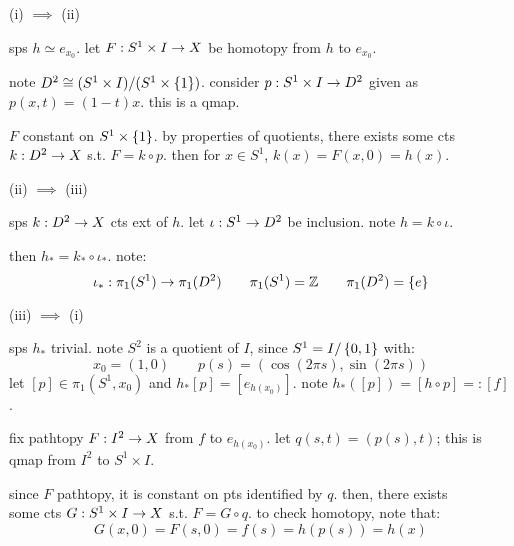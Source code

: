 \newpage
\begin{pf}[source=Primary Source Material]
    (i) $\implies$ (ii)
    \begin{block}
        sps $h\simeq e_{x_{0}}$. let $F:S^{1}\times I\rightarrow X$ be homotopy from $h$ to $e_{x_{0}}$.

        note $D^{2}\cong(S^{1}\times I)/(S^{1}\times\left\{{1}\right\})$.
        consider $p:S^{1}\times I\rightarrow D^{2}$ given as $p(x,t)=(1-t)x$.
        this is a qmap.

        $F$ constant on $S^{1}\times\left\{{1}\right\}$.
        by properties of quotients, there exists some cts $k:D^{2}\rightarrow X$ s.t. $F=k\circ p$.
        then for $x\in S^{1}$, $k(x)=F(x,0)=h(x)$.
    \end{block}
    (ii) $\implies$ (iii)
    \begin{block}
        sps $k:D^{2}\rightarrow X$ cts ext of $h$.
        let $\iota:S^{1}\rightarrow D^{2}$ be inclusion. note $h=k\circ\iota$.
        
        then $h_{*}=k_{*}\circ\iota_{*}$. note:
        \begin{equation*}
            \iota_{*}:\pi_{1}(S^{1})\rightarrow\pi_{1}(D^{2}) \qquad
            \pi_{1}(S^{1})=\mathbb{Z} \qquad \pi_{1}(D^{2})=\left\{{e}\right\}
        \end{equation*}
    \end{block}
    (iii) $\implies$ (i)
    \begin{block}
        sps $h_{*}$ trivial.
        note $S^{2}$ is a quotient of $I$, since $S^{1}=I/\left\{{0,1}\right\}$ with:
        \begin{equation*}
            x_{0}=(1,0) \qquad p(s)=(\cos(2\pi s),\sin(2\pi s))
        \end{equation*}
        let $[p]\in\pi_{1}(S^{1},x_{0})$ and $h_{*}[p]=[e_{h(x_{0})}]$.
        note $h_{*}([p])=[h\circ p]=:[f]$.

        fix pathtopy $F:I^{2}\rightarrow X$ from $f$ to $e_{h(x_{0})}$.
        let $q(s,t)=(p(s),t)$; this is qmap from $I^{2}$ to $S^{1}\times I$.

        since $F$ pathtopy, it is constant on pts identified by $q$.
        then, there exists \\ %
        some cts $G:S^{1}\times I\rightarrow X$ s.t. $F=G\circ q$.
        to check homotopy, note that:
        \begin{equation*}
            G(x,0)=F(s,0)=f(s)=h(p(s))=h(x)
        \end{equation*}
    \end{block}
\end{pf} \

